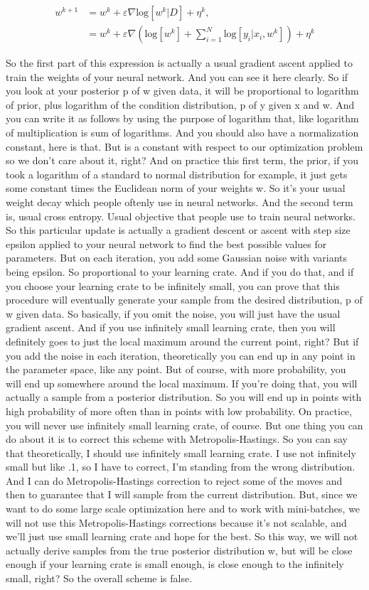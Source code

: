 \documentclass[11pt, oneside, reqno]{amsart}
\numberwithin{equation}{section}
\theoremstyle{plain}%
\theoremstyle{definition}
\theoremstyle{remark}
\begin{document}
\begin{align*}
	w^{k+1}&=w^k+\varepsilon\nabla \text{log}[w^k|D]+\eta^k,\\
	&=w^k+\varepsilon\nabla\left(\text{log}[w^k]+\sum^N_{i=1}\text{log}[y_i|x_i,w^k]\right)+\eta^k
\end{align*}

So the first part of this expression is actually a usual gradient ascent applied to train the weights of your neural network. And you can see it here clearly. So if you look at your posterior p of w given data, it will be proportional to logarithm of prior, plus logarithm of the condition distribution, p of y given x and w. And you can write it as follows by using the purpose of logarithm that, like logarithm of multiplication is sum of logarithms. And you should also have a normalization constant, here is that. But is a constant with respect to our optimization problem so we don't care about it, right? And on practice this first term, the prior, if you took a logarithm of a standard to normal distribution for example, it just gets some constant times the Euclidean norm of your weights w. So it's your usual weight decay which people oftenly use in neural networks. And the second term is, usual cross entropy. Usual objective that people use to train neural networks. So this particular update is actually a gradient descent or ascent with step size epsilon applied to your neural network to find the best possible values for parameters. But on each iteration, you add some Gaussian noise with variants being epsilon. So proportional to your learning crate. And if you do that, and if you choose your learning crate to be infinitely small, you can prove that this procedure will eventually generate your sample from the desired distribution, p of w given data. So basically, if you omit the noise, you will just have the usual gradient ascent. And if you use infinitely small learning crate, then you will definitely goes to just the local maximum around the current point, right? But if you add the noise in each iteration, theoretically you can end up in any point in the parameter space, like any point. But of course, with more probability, you will end up somewhere around the local maximum. If you're doing that, you will actually a sample from a posterior distribution. So you will end up in points with high probability of more often than in points with low probability. On practice, you will never use infinitely small learning crate, of course. But one thing you can do about it is to correct this scheme with Metropolis-Hastings. So you can say that theoretically, I should use infinitely small learning crate. I use not infinitely small but like .1, so I have to correct, I'm standing from the wrong distribution. And I can do Metropolis-Hastings correction to reject some of the moves and then to guarantee that I will sample from the current distribution. But, since we want to do some large scale optimization here and to work with mini-batches, we will not use this Metropolis-Hastings corrections because it's not scalable, and we'll just use small learning crate and hope for the best. So this way, we will not actually derive samples from the true posterior distribution w, but will be close enough if your learning crate is small enough, is close enough to the infinitely small, right? So the overall scheme is false.
\end{document}
